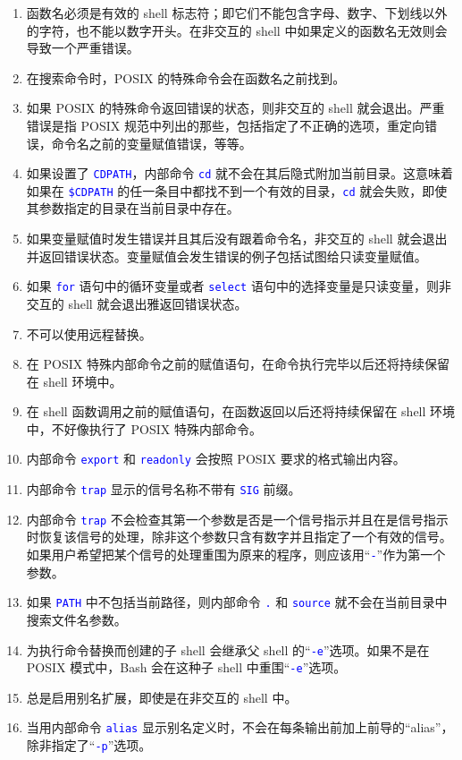 \documentclass[openany,notitlepage]{book}
\newcommand{\code}[1]{\textcolor{blue}{{\tt #1}}}
\begin{document}
\begin{CJK}{UTF8}{song}
\begin{enumerate}
    \item 函数名必须是有效的 shell 标志符；即它们不能包含字母、数字、下划线以外的字符，也不能以数字开头。在非交互的 shell 中如果定义的函数名无效则会导致一个严重错误。
    \item 在搜索命令时，POSIX 的特殊命令会在函数名之前找到。
    \item 如果 POSIX 的特殊命令返回错误的状态，则非交互的 shell 就会退出。严重错误是指 POSIX 规范中列出的那些，包括指定了不正确的选项，重定向错误，命令名之前的变量赋值错误，等等。
    \item 如果设置了 \code{CDPATH}，内部命令 \code{cd} 就不会在其后隐式附加当前目录。这意味着如果在 \code{\$CDPATH} 的任一条目中都找不到一个有效的目录，\code{cd} 就会失败，即使其参数指定的目录在当前目录中存在。
    \item 如果变量赋值时发生错误并且其后没有跟着命令名，非交互的 shell 就会退出并返回错误状态。变量赋值会发生错误的例子包括试图给只读变量赋值。
    \item 如果 \code{for} 语句中的循环变量或者 \code{select} 语句中的选择变量是只读变量，则非交互的 shell 就会退出雅返回错误状态。
    \item 不可以使用远程替换。
    \item 在 POSIX 特殊内部命令之前的赋值语句，在命令执行完毕以后还将持续保留在 shell 环境中。
    \item 在 shell 函数调用之前的赋值语句，在函数返回以后还将持续保留在 shell 环境中，不好像执行了 POSIX 特殊内部命令。
    \item 内部命令 \code{export} 和 \code{readonly} 会按照 POSIX 要求的格式输出内容。
    \item 内部命令 \code{trap} 显示的信号名称不带有 \code{SIG} 前缀。
    \item 内部命令 \code{trap} 不会检查其第一个参数是否是一个信号指示并且在是信号指示时恢复该信号的处理，除非这个参数只含有数字并且指定了一个有效的信号。如果用户希望把某个信号的处理重围为原来的程序，则应该用``\code{-}''作为第一个参数。
    \item 如果 \code{PATH} 中不包括当前路径，则内部命令 \code{.} 和 \code{source} 就不会在当前目录中搜索文件名参数。
    \item 为执行命令替换而创建的子 shell 会继承父 shell 的``\code{-e}''选项。如果不是在 POSIX 模式中，Bash 会在这种子 shell 中重围``\code{-e}''选项。
    \item 总是启用别名扩展，即使是在非交互的 shell 中。
    \item 当用内部命令 \code{alias} 显示别名定义时，不会在每条输出前加上前导的``alias\textvisiblespace{}''，除非指定了``\code{-p}''选项。

\end{enumerate}
\end{CJK}
\end{document}
